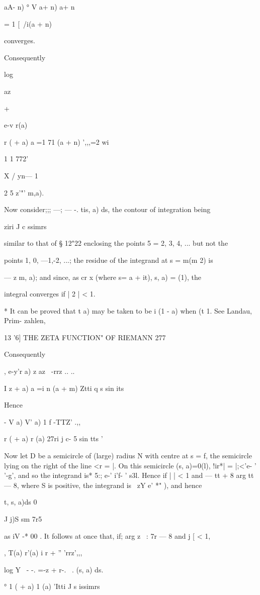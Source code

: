 {{ aA- n) ° V a+ n) a+ n

= 1 [\ /i(a + n)

converges.

Consequently

log

az

+

e-v r(a)

r ( + a) a =1 71 (a + n) ',,,=2 wi

1 1 772'

X / yn— 1

2 5 z'"' m,a).

Now consider;;; —; — -. tis, a) ds, the contour of integration being

ziri J c ssimrs

similar to that of § 12"22 enclosing the points 5 = 2, 3, 4, ... but
not the

points 1, 0, —1,-2, ...; the residue of the integrand at s = m(m 2) is

— z m, a); and since, as cr x (where s= a + it), s, a) = (1), the

integral converges if | 2 | < 1.

* It can be proved that t a) may be taken to be i (1 - a) when (t 1.
See Landau, Prim- zahlen, %

13 '6] THE ZETA FUNCTION" OF RIEMANN 277

Consequently

, e-y'r a) z az \ -rrz .. ..

I z + a) a =i n (a + m) Ztti q s sin its

Hence

- V a) V' a) 1 f -TTZ' .,,

  r ( + a) r (a) 27ri j c- 5 sin tts '

Now let D be a semicircle of (large) radius N with centre at s = f,
the semicircle lying on the right of the line <r = |. On this
semicircle (s, a)=0(l), !ir*| = |;<'e- ' '-g', and so the integrand
is* 5:; e-' i'f- ' s3l. Hence if | | < 1 and — tt + 8 arg tt — 8,
where S is positive, the integrand is \ zY e' *" ), and hence

t, s, a)ds 0

J j)S sm 7r5

as iV -* 00 . It follows at once that, if; arg z \ : 7r — 8 and j [ <
1,

, T(a) r'(a) i r + '' 'rrz',,,

log Y ~- -. =-z + r-. ~. (s, a) ds.

° 1 ( + a) 1 (a) 'Itti J s issimrs

}}

